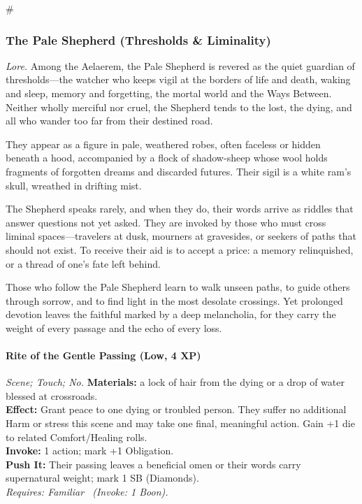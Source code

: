 # %

\subsubsection{The Pale Shepherd (Thresholds \& Liminality)}
\textit{Lore.} Among the Aelaerem, the Pale Shepherd is revered as the quiet guardian of thresholds—the watcher who keeps vigil at the borders of life and death, waking and sleep, memory and forgetting, the mortal world and the Ways Between. Neither wholly merciful nor cruel, the Shepherd tends to the lost, the dying, and all who wander too far from their destined road.  

They appear as a figure in pale, weathered robes, often faceless or hidden beneath a hood, accompanied by a flock of shadow-sheep whose wool holds fragments of forgotten dreams and discarded futures. Their sigil is a white ram’s skull, wreathed in drifting mist.  

The Shepherd speaks rarely, and when they do, their words arrive as riddles that answer questions not yet asked. They are invoked by those who must cross liminal spaces—travelers at dusk, mourners at gravesides, or seekers of paths that should not exist. To receive their aid is to accept a price: a memory relinquished, or a thread of one’s fate left behind.  

Those who follow the Pale Shepherd learn to walk unseen paths, to guide others through sorrow, and to find light in the most desolate crossings. Yet prolonged devotion leaves the faithful marked by a deep melancholia, for they carry the weight of every passage and the echo of every loss.

\paragraph*{Rite of the Gentle Passing (Low, 4 XP)} \emph{Scene; Touch; No.}
\textbf{Materials:} a lock of hair from the dying or a drop of water blessed at crossroads.\\
\textbf{Effect:} Grant peace to one dying or troubled person. They suffer no additional Harm or stress this scene and may take one final, meaningful action. Gain +1 die to related Comfort/Healing rolls.\\
\textbf{Invoke:} 1 action; mark +1 Obligation.\\
\textbf{Push It:} Their passing leaves a beneficial omen or their words carry supernatural weight; mark 1 SB (Diamonds).\\
\emph{Requires: Familiar \ (\textit{Invoke:} 1 Boon).}

